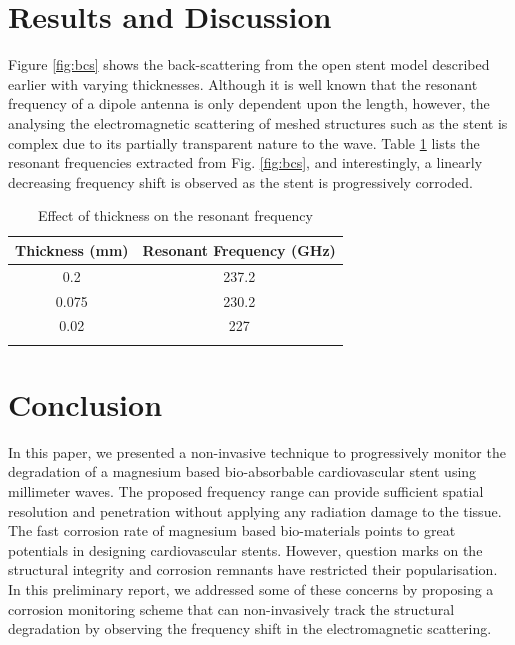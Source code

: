 \documentclass[conference,a4paper]{IEEEtran}
\begin{document}
\section{Results and Discussion}
%
Figure \ref{fig:bcs} shows the back-scattering from the open stent model described earlier with varying thicknesses. Although it is well known that the resonant frequency of a dipole antenna is only dependent upon the length, however, the analysing the electromagnetic scattering of meshed structures such as the stent is complex due to its partially transparent nature to the wave. Table \ref{tab:resonance} lists the resonant frequencies extracted from Fig. \ref{fig:bcs}, and interestingly, a linearly decreasing frequency shift is observed as the stent is progressively corroded.
%
\begin{table}[!h]
  \centering
  \renewcommand{\arraystretch}{1.3}
  \caption{Effect of thickness on the resonant frequency}
  \centering
  \begin{tabularx}{.65\columnwidth}{c c}
    \toprule
    Thickness (mm) & Resonant Frequency (GHz)\\
    \midrule \midrule
    \num{0.2} & \num{237.2} \\
    \num{0.075} & \num{230.2} \\
    \num{0.02} & \num{227} \\
    \bottomrule \\
  \end{tabularx}
  \label{tab:resonance}
\end{table}
%

\vspace{7pt}
\section{Conclusion}
%
In this paper, we presented a non-invasive technique to progressively monitor the degradation of a magnesium based bio-absorbable cardiovascular stent using millimeter waves.
The proposed frequency range can provide sufficient spatial resolution and penetration without applying any radiation damage to the tissue. The fast corrosion rate of magnesium based bio-materials points to great potentials in designing cardiovascular stents. However, question marks on the structural integrity and corrosion remnants have restricted their popularisation. In this preliminary report, we addressed some of these concerns by proposing a corrosion monitoring scheme that can non-invasively track the structural degradation by observing the frequency shift in the electromagnetic scattering.
\vspace{7pt}
\end{document}
